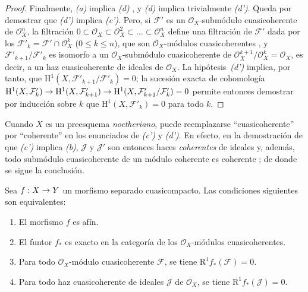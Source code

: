 \documentclass[oneside,10pt]{amsart}
\makeatletter
\renewcommand{\leq}{\leqslant}
\newcommand{\ega@arrow}[2]{\mathchoice{#1}{#2}{#2}{#2}}
\renewcommand{\to}{\ega@arrow{\longrightarrow}{\rightarrow}}
\let\EGAOriginalLabel\label
\renewcommand{\label}[1]{\phantomsection\EGAOriginalLabel{#1}}
\makeatother
\begin{document}
\begin{proof}
Finalmente, \emph{(a)} implica \emph{(d)} , y \emph{(d)} implica trivialmente \emph{(d')}.
Queda por demostrar que \emph{(d')} implica \emph{(c')}.
Pero, si $\mathcal{F}'$ es un $\mathcal{O}_X$-submódulo cuasicoherente de $\mathcal{O}_X^n$, la filtración $0\subset\mathcal{O}_X\subset\mathcal{O}_X^2\subset\ldots\subset
\mathcal{O}_X^n$ define una filtración de $\mathcal{F}'$ dada por los $\mathcal{F}'_k=\mathcal{F}'\cap\mathcal{O}_X^k$ ($0\leq k\leq n$), que son $\mathcal{O}_X$-módulos cuasicoherentes , y $\mathcal{F}'_{k+1}/\mathcal{F}'_k$ es isomorfo a un $\mathcal{O}_X$-submódulo cuasicoherente de $\mathcal{O}_X^{k+1}/\mathcal{O}_X^k=\mathcal{O}_X$, es decir, a un haz cuasicoherente de ideales de $\mathcal{O}_X$.
La hipótesis~\emph{(d')} implica, por tanto, que $\mathrm{H}^1(X,\mathcal{F}'_{k+1}/\mathcal{F}'_k)=0$;
la sucesión exacta de cohomología $\mathrm{H}^1(X,\mathcal{F}'_k)\to\mathrm{H}^1(X,\mathcal{F}'_{k+1})
\to\mathrm{H}^1(X,\mathcal{F}'_{k+1}/\mathcal{F}'_k)=0$ permite entonces demostrar por inducción sobre $k$ que $\mathrm{H}^1(X,\mathcal{F}'_k)=0$ para todo $k$.
\end{proof}

\begin{remark}[5.2.1.1]
\label{II.5.2.1.1-fr}
Cuando $X$ es un preesquema \emph{noetheriano}, puede reemplazarse ``cuasicoherente'' por ``coherente'' en los enunciados de \emph{(c')} y \emph{(d')}.
En efecto, en la demostración de que \emph{(c')} implica \emph{(b)}, $\mathcal{J}$ y $\mathcal{J}'$ son entonces haces \emph{coherentes} de ideales y, además, todo submódulo cuasicoherente de un módulo coherente es coherente ;
de donde se sigue la conclusión.
\end{remark}

\begin{corollary}[5.2.2]
\label{II.5.2.2-fr}
Sea $f:X\to Y$ un morfismo separado cuasicompacto.
Las condiciones siguientes son equivalentes:
\begin{enumerate}
  \item[{\rm(a)}] El morfismo $f$ es afín.
  \item[{\rm(b)}] El funtor $f_*$ es exacto en la categoría de los $\mathcal{O}_X$-módulos cuasicoherentes.
  \item[{\rm(c)}] Para todo $\mathcal{O}_X$-módulo cuasicoherente $\mathcal{F}$, se tiene $\mathrm{R}^1f_*(\mathcal{F})=0$.
  \item[{\rm(c')}] Para todo haz cuasicoherente de ideales $\mathcal{J}$ de $\mathcal{O}_X$, se tiene $\mathrm{R}^1f_*(\mathcal{J})=0$.
\end{enumerate}
\end{corollary}
\end{document}
